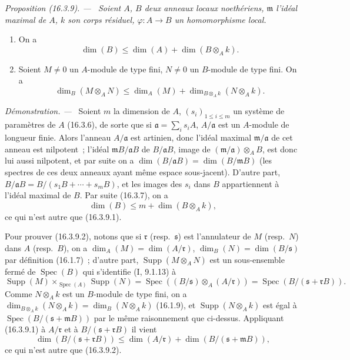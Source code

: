 \documentclass[10pt,oneside]{book}
\makeatletter
\newcommand{\setmanualcurrentlabel}[1]{\def\@currentlabel{#1}}
\newcommand{\oldpage}[2][]{%
  \setcounter{footnote}{0}%
  \marginpar{\scriptsize\textbf{#1}~|~#2}\ignorespaces}
\newenvironment{proposition}[1][]{%
  \setmanualcurrentlabel{#1}\par\medskip\noindent\itshape Proposition (#1). ---\ }{\par}
\newenvironment{proof}{%
  \par\medskip\noindent\textit{Démonstration. ---\ }}{\par}
\makeatother
\begin{document}
\begin{proposition}[16.3.9]
\label{0.16.3.9-fr}
Soient $A$, $B$ deux anneaux locaux noethériens, $\mathfrak{m}$ l'idéal maximal
de $A$, $k$ son corps résiduel, $\varphi:A\to B$ un homomorphisme local.
\begin{enumerate}
  \item[\rm{(i)}] On a
  \begin{equation}
  \label{0.16.3.9.1-fr}
  \tag{16.3.9.1}
    \dim(B)\leq\dim(A)+\dim(B\otimes_A k).
  \end{equation}
  \item[\rm{(ii)}] Soient $M\neq0$ un $A$-module de type fini, $N\neq0$ un
  $B$-module de type fini. On a
  \begin{equation}
  \label{0.16.3.9.2-fr}
  \tag{16.3.9.2}
    \dim_B(M\otimes_A N)
    \leq\dim_A(M)+\dim_{B\otimes_A k}(N\otimes_A k).
  \end{equation}
\end{enumerate}
\end{proposition}

\begin{proof}
Soient $m$ la dimension de $A$, $(s_i)_{1\leq i\leq m}$ un système de
paramètres de $A$ (16.3.6), de sorte que si
$\mathfrak{a}=\sum_i s_iA$, $A/\mathfrak{a}$ est un $A$-module de longueur
finie. Alors l'anneau $A/\mathfrak{a}$ est artinien, donc l'idéal maximal
$\mathfrak{m}/\mathfrak{a}$ de cet anneau est nilpotent~; l'idéal
$\mathfrak{m}B/\mathfrak{a}B$ de $B/\mathfrak{a}B$, image de
$(\mathfrak{m}/\mathfrak{a})\otimes_A B$, est donc lui aussi nilpotent, et par
suite on a
$\dim(B/\mathfrak{a}B)=\dim(B/\mathfrak{m}B)$ (les spectres de ces deux
anneaux ayant même espace sous-jacent). D'autre part,
$B/\mathfrak{a}B=B/(s_1B+\cdots+s_mB)$, et les images des $s_i$ dans $B$
appartiennent à l'idéal maximal de $B$. Par suite (16.3.7), on a
\[
  \dim(B)\leq m+\dim(B\otimes_A k),
\]
ce qui n'est autre que (16.3.9.1).

Pour prouver (16.3.9.2), notons que si $\mathfrak{r}$ (resp.~$\mathfrak{s}$)
est l'annulateur de $M$ (resp.~$N$)
\oldpage[0\textsubscript{IV-1}]{32}
dans $A$ (resp.~$B$), on a
$\dim_A(M)=\dim(A/\mathfrak{r})$, $\dim_B(N)=\dim(B/\mathfrak{s})$ par
définition (16.1.7)~; d'autre part, $\operatorname{Supp}(M\otimes_A N)$ est un
sous-ensemble fermé de $\operatorname{Spec}(B)$ qui s'identifie (I, 9.1.13) à
\[
  \operatorname{Supp}(M)\times_{\operatorname{Spec}(A)}\operatorname{Supp}(N)
  =\operatorname{Spec}((B/\mathfrak{s})\otimes_A(A/\mathfrak{r}))
  =\operatorname{Spec}(B/(\mathfrak{s}+\mathfrak{r}B)).
\]
Comme $N\otimes_A k$ est un $B$-module de type fini, on a
$\dim_{B\otimes_A k}(N\otimes_A k)=\dim_B(N\otimes_A k)$ (16.1.9), et
$\operatorname{Supp}(N\otimes_A k)$ est égal à
$\operatorname{Spec}(B/(\mathfrak{s}+\mathfrak{m}B))$ par le même raisonnement
que ci-dessus. Appliquant (16.3.9.1) à $A/\mathfrak{r}$ et à
$B/(\mathfrak{s}+\mathfrak{r}B)$ il vient
\[
  \dim(B/(\mathfrak{s}+\mathfrak{r}B))
  \leq\dim(A/\mathfrak{r})+
  \dim(B/(\mathfrak{s}+\mathfrak{m}B)),
\]
ce qui n'est autre que (16.3.9.2).
\end{proof}
\end{document}
